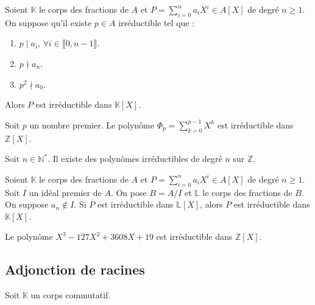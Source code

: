 
  \begin{theorem}
    Soient $\mathbb{K}$ le corps des fractions de $A$ et $P = \sum_{i=0}^n a_i X^i \in A[X]$ de degré $n \geq 1$. On suppose qu'il existe $p \in A$ irréductible tel que :
    \begin{enumerate}[label=(\roman*)]
      \item $p \mid a_i$, $\forall i \in \llbracket 0, n-1 \rrbracket$.
      \item $p \nmid a_n$.
      \item $p^2 \nmid a_0$.
    \end{enumerate}
    Alors $P$ est irréductible dans $\mathbb{K}[X]$.
  \end{theorem}

  \begin{example}
    Soit $p$ un nombre premier. Le polynôme $\Phi_p = \sum_{k=0}^{p-1} X^k$ est irréductible dans $\mathbb{Z}[X]$.
  \end{example}


  \begin{application}
    \label{141-3}
    Soit $n \in \mathbb{N}^*$. Il existe des polynômes irréductibles de degré $n$ sur $\mathbb{Z}$.
  \end{application}


  \begin{theorem}
    Soient $\mathbb{K}$ le corps des fractions de $A$ et $P = \sum_{i=0}^n a_i X^i \in A[X]$ de degré $n \geq 1$. Soit $I$ un idéal premier de $A$. On pose $B=A/I$ et $\mathbb{L}$ le corps des fractions de $B$. On suppose $a_n \notin I$.
    \newpar
    Si $\overline{P}$ est irréductible dans $\mathbb{L}[X]$, alors $P$ est irréductible dans $\mathbb{K}[X]$.
  \end{theorem}

  \begin{example}
    Le polynôme $X^3-127X^2+3608X+19$ est irréductible dans $\mathbb{Z}[X]$.
  \end{example}

  \subsection{Adjonction de racines}

  Soit $\mathbb{K}$ un corps commutatif.

